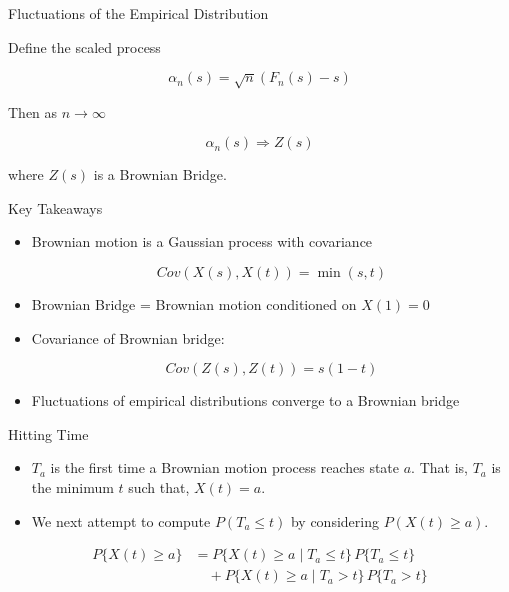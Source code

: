 \documentclass{beamer}
\begin{document}
\begin{frame}{Fluctuations of the Empirical Distribution}

Define the scaled process

\[
\alpha_n(s) = \sqrt{n}(F_n(s)-s)
\]

Then as $n \to \infty$

\[
\alpha_n(s) \Rightarrow Z(s)
\]

where $Z(s)$ is a Brownian Bridge.

\end{frame}

\begin{frame}{Key Takeaways}

\begin{itemize}

\item Brownian motion is a Gaussian process with covariance

\[
Cov(X(s),X(t)) = \min(s,t)
\]

\item Brownian Bridge = Brownian motion conditioned on $X(1)=0$

\item Covariance of Brownian bridge:

\[
Cov(Z(s),Z(t)) = s(1-t)
\]

\item Fluctuations of empirical distributions converge to a Brownian bridge

\end{itemize}

\end{frame}

	\begin{frame}{Hitting Time}

    \begin{itemize}
        \item \(T_a\) is the first time a Brownian motion process reaches state $a$. That is, $T_a$ is the minimum $t$ such that, $X(t)=a$.
        \item We next attempt to compute $P(T_a\le t)$ by considering $P(X(t)\ge a)$.
    \end{itemize}

    \[
        \begin{aligned}
        P\{X(t)\ge a\}
        &=
        P\{X(t)\ge a \mid T_a \le t\}\,P\{T_a \le t\} \\
        &\quad + P\{X(t)\ge a \mid T_a > t\}\,P\{T_a > t\}
        \end{aligned}
    \]
		
	\end{frame}
\end{document}
